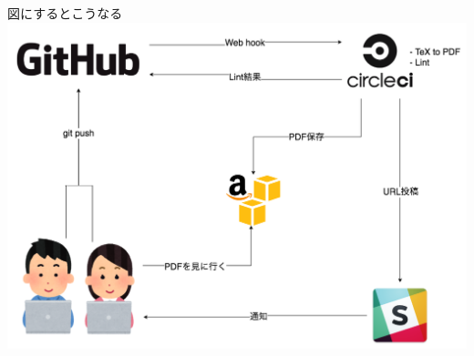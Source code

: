 \documentclass{beamer}
\begin{document}
\begin{frame}{図にするとこうなる}
  \includegraphics[width=\textwidth, bb=0 0 1038 739]{img/ideal_sequence.png}
\end{frame}
\end{document}
